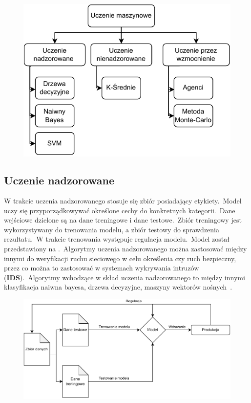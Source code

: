 \begin{figure}[H]
    \centering
    \includegraphics[width=\textwidth]{images/ml-przyklady}
    \label{fig:ml-schema}
\end{figure}

\pagebreak

\subsection{Uczenie nadzorowane}
W trakcie uczenia nadzorowanego stosuje się zbiór posiadający etykiety.\ Model uczy się przyporządkowywać określone cechy do konkretnych kategorii.\ Dane wejściowe dzielone są na dane treningowe i dane testowe.\ Zbiór treningowy jest wykorzystywany do trenowania modelu, a zbiór testowy do sprawdzenia rezultatu.\ W trakcie trenowania występuje regulacja modelu.\ Model został przedstawiony na .\ Algorytmy uczenia nadzorowanego można zastosować między innymi do weryfikacji ruchu sieciowego w celu określenia czy ruch bezpieczny, przez co można to zastosować w systemach wykrywania intruzów  (\textbf{IDS}).\ Algorytmy wchodzące w skład uczenia nadzorowanego to między innymi klasyfikacja naiwna bayesa, drzewa decyzyjne, maszyny wektorów nośnych~\cite{AiScience, Mahesh2018}.

\begin{figure}[H]
    \centering
    \includegraphics[width=\textwidth]{images/supervised}
    \label{fig:spervised}
\end{figure}


